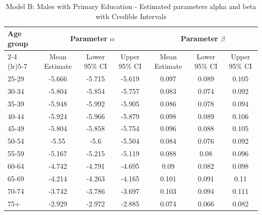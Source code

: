 \begin{landscape}
\begin{table}[htbp]
\centering
\caption{Model B: Males with Primary Education - Estimated parameters alpha and beta  with Credible Intervals}
\label{tab:parameters_ab14}
\begin{tabular}{@{}lcccccc@{}}
\toprule
Age group & \multicolumn{3}{c}{Parameter \(\alpha\)} & \multicolumn{3}{c}{Parameter \(\beta\)} \\ 
\cmidrule(lr){2-4} \cmidrule(lr){5-7}
          & Mean Estimate & Lower 95\% CI & Upper 95\% CI & Mean Estimate & Lower 95\% CI & Upper 95\% CI \\ 
\midrule
25-29 & -5.666 & -5.715 & -5.619 & 0.097 & 0.089 & 0.105 \\
30-34 & -5.804 & -5.854 & -5.757 & 0.083 & 0.074 & 0.092 \\
35-39 & -5.948 & -5.992 & -5.905 & 0.086 & 0.078 & 0.094 \\
40-44 & -5.924 & -5.966 & -5.879 & 0.098 & 0.089 & 0.106 \\
45-49 & -5.804 & -5.858 & -5.754 & 0.096 & 0.088 & 0.105 \\
50-54 & -5.55 & -5.6 & -5.504 & 0.084 & 0.076 & 0.092 \\
55-59 & -5.167 & -5.215 & -5.119 & 0.088 & 0.08 & 0.096 \\
60-64 & -4.742 & -4.791 & -4.695 & 0.09 & 0.082 & 0.098 \\
65-69 & -4.214 & -4.263 & -4.165 & 0.101 & 0.091 & 0.11 \\
70-74 & -3.742 & -3.786 & -3.697 & 0.103 & 0.094 & 0.111 \\
75+ & -2.929 & -2.972 & -2.885 & 0.074 & 0.066 & 0.082 \\
\bottomrule
\end{tabular}
\end{table}
\end{landscape}